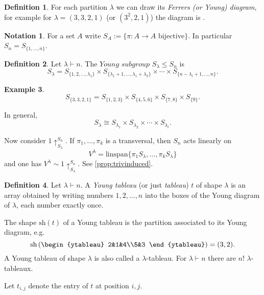 \documentclass[a4paper]{article}
\newcommand{\linspan}{\text{linspan}}
\newcommand{\sh}{\text{sh}}
\theoremstyle{definition}
\newtheorem{defn}{Definition}[subsection]
\newtheorem{example}[defn]{Example}
\newtheorem*{notation}{Notation}
\begin{document}
\begin{defn}
For each partition $\lambda$ we can draw its \textit{Ferrers (or Young) diagram}, for example for $\lambda=(3,3,2,1)$ (or $(3^2,2,1)$) the diagram is .
\end{defn}

\begin{notation}
For a set $A$ write $S_A:=\{\pi:A\rightarrow A\text{ bijective}\}$. In particular $S_n=S_{\{1,\ldots,n\}}$.
\end{notation}

\begin{defn}
Let $\lambda\vdash n$. The $\textit{Young subgroup}$ $S_\lambda\leq S_n$ is
\[
S_\lambda=S_{\{1,2,\ldots,\lambda_1\}}\times S_{\{\lambda_1+1,\ldots,\lambda_1+\lambda_2\}}\times\cdots\times S_{\{n-\lambda_l+1,\ldots,n\}}.
\]
\end{defn}
\begin{example}
\[
S_{\{3,3,2,1\}}=S_{\{1,2,3\}}\times S_{\{4,5,6\}}\times S_{\{7,8\}}\times S_{\{9\}}.
\]

In general,
\[
S_\lambda\cong S_{\lambda_1}\times S_{\lambda_2}\times\cdots\times S_{\lambda_l}.
\]
\end{example}

Now consider $1\uparrow_{S_\lambda}^{S_n}$. If $\pi_1,\ldots,\pi_k$ is a transversal, then $S_n$ acts linearly on
\[
V^\lambda=\linspan\{\pi_1 S_\lambda,\ldots,\pi_k S_\lambda\}
\]
and one has $V^\lambda\sim 1\uparrow_{S_\lambda}^{S_n}$. See \ref{prop:trivinduced}.

\begin{defn}
Let $\lambda\vdash n$. A \textit{Young tableau} (or just \textit{tableau}) $t$ of shape $\lambda$ is an array obtained by writing numbers $1,2,\ldots,n$ into the boxes of the Young diagram of $\lambda$, each number exactly once.

The shape $\sh(t)$ of a Young tableau is the partition associated to its Young diagram, e.g.
\[
\sh\left(\begin{ytableau}
  2&1&4\\5&3
\end{ytableau}\right)=(3,2).
\]
A Young tableau of shape $\lambda$ is also called a $\lambda$-tableau. For $\lambda\vdash n$ there are $n!$ $\lambda$-tableaux.

Let $t_{i,j}$ denote the entry of $t$ at position $i,j$.
\end{defn}
\end{document}
